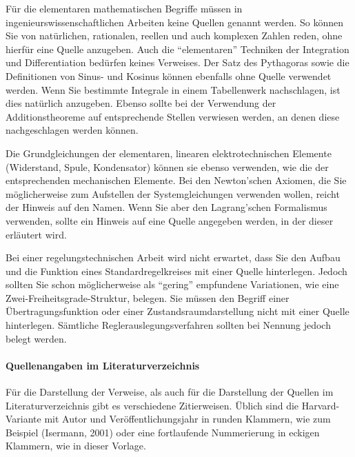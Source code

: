 Für die elementaren mathematischen Begriffe müssen in ingenieurswissenschaftlichen Arbeiten keine Quellen genannt werden.
So können Sie von natürlichen, rationalen, reellen und auch komplexen Zahlen reden, ohne hierfür eine Quelle anzugeben. Auch die "`elementaren"' Techniken der Integration und Differentiation bedürfen keines Verweises.
Der Satz des Pythagoras sowie die Definitionen von Sinus- und Kosinus können ebenfalls ohne Quelle verwendet werden.
Wenn Sie bestimmte Integrale in einem Tabellenwerk nachschlagen, ist dies natürlich anzugeben. Ebenso sollte bei der Verwendung der Additionstheoreme auf entsprechende Stellen verwiesen werden, an denen diese nachgeschlagen werden können.

Die Grundgleichungen der elementaren, linearen elektrotechnischen Elemente (Widerstand, Spule, Kondensator) können sie ebenso verwenden, wie die der entsprechenden mechanischen Elemente.
Bei den Newton'schen Axiomen, die Sie möglicherweise zum Aufstellen der Systemgleichungen verwenden wollen, reicht der Hinweis auf den Namen.
Wenn Sie aber \zB den Lagrang'schen Formalismus verwenden, sollte ein Hinweis auf eine Quelle angegeben werden, in der dieser erläutert wird.

Bei einer regelungstechnischen Arbeit wird nicht erwartet, dass Sie den Aufbau und die Funktion eines Standardregelkreises mit einer Quelle hinterlegen.
Jedoch sollten Sie schon möglicherweise als "`gering"' empfundene Variationen, wie eine Zwei-Freiheitsgrade-Struktur, belegen.
Sie müssen den Begriff einer Übertragungsfunktion oder einer Zustandsraumdarstellung nicht mit einer Quelle hinterlegen.
Sämtliche Reglerauslegungsverfahren sollten bei Nennung jedoch belegt werden.


\paragraph{Quellenangaben im Literaturverzeichnis}
Für die Darstellung der Verweise, als auch für die Darstellung der Quellen im Literaturverzeichnis gibt es verschiedene Zitierweisen.
Üblich sind die Harvard-Variante mit Autor und Veröffentlichungsjahr in runden Klammern, wie zum Beispiel (Isermann, 2001) oder eine fortlaufende Nummerierung in eckigen Klammern, wie in dieser Vorlage.

